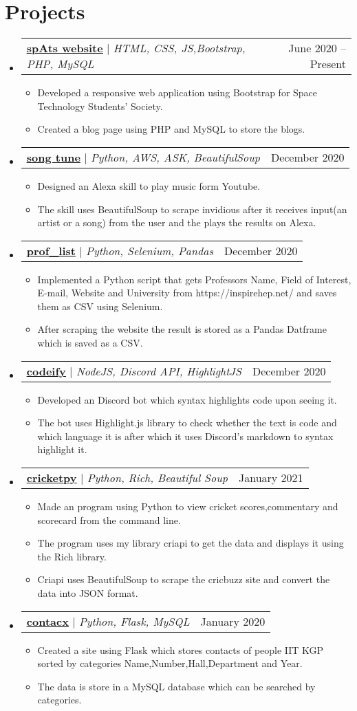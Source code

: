 \documentclass[letterpaper,11pt]{article}
\makeatletter
\newcommand{\resumeItem}[1]{
  \item\small{
    {#1 \vspace{-2pt}}
  }
}
\newcommand{\resumeProjectHeading}[2]{
    \item
    \begin{tabular*}{0.97\textwidth}{l@{\extracolsep{\fill}}r}
      \small#1 & #2 \\
    \end{tabular*}\vspace{-7pt}
}
\newcommand{\resumeSubHeadingListStart}{\begin{itemize}[leftmargin=0.15in, label={}]}
\newcommand{\resumeSubHeadingListEnd}{\end{itemize}}
\newcommand{\resumeItemListStart}{\begin{itemize}}
\newcommand{\resumeItemListEnd}{\end{itemize}\vspace{-5pt}}
\makeatother
\begin{document}
\section{Projects}
    \resumeSubHeadingListStart
      \resumeProjectHeading
          {\textbf{\href{http://spats.in/}{\underline{spAts website}}} $|$ \emph{HTML, CSS, JS,Bootstrap, PHP, MySQL}}{June 2020 -- Present}
          \resumeItemListStart
            \resumeItem{Developed a responsive web application using Bootstrap for Space Technology Students' Society.}
            \resumeItem{Created a blog page using PHP and MySQL to store the blogs.}
          \resumeItemListEnd
           \resumeProjectHeading
         {\textbf{\href{https://github.com/sAksham-Ar/song-tune}{\underline{song tune}}} $|$ \emph{Python, AWS, ASK, BeautifulSoup}}{December 2020}
          \resumeItemListStart
            \resumeItem{Designed an Alexa skill to play music form Youtube.}
            \resumeItem{The skill uses BeautifulSoup to scrape invidious after it receives input(an artist or a song) from the user and the plays the results on Alexa.}
          \resumeItemListEnd
           \resumeProjectHeading
         {\textbf{\href{https://github.com/sAksham-Ar/Prof_List}{\underline{prof\_list}}} $|$ \emph{Python, Selenium, Pandas}}{December 2020}
          \resumeItemListStart
            \resumeItem{Implemented a Python script that gets Professors Name, Field of Interest, E-mail, Website and University from https://inspirehep.net/ and saves them as CSV using Selenium. }
            \resumeItem{After scraping the website the result is stored as a Pandas Datframe which is saved as a CSV.}
          \resumeItemListEnd
           \resumeProjectHeading
         {\textbf{\href{https://github.com/sAksham-Ar/codeify}{\underline{codeify}}} $|$ \emph{NodeJS, Discord API, HighlightJS}}{December 2020}
          \resumeItemListStart
            \resumeItem{Developed an Discord bot which syntax highlights code upon seeing it.}
            \resumeItem{The bot uses Highlight.js library to check whether the text is  code and which language it is after which it uses Discord's markdown to syntax highlight it.}
          \resumeItemListEnd
 \resumeProjectHeading
         {\textbf{\href{https://github.com/sAksham-Ar/cricketpy}{\underline{cricketpy}}} $|$ \emph{Python, Rich, Beautiful Soup}}{January 2021}
          \resumeItemListStart
            \resumeItem{Made an program using Python to view cricket scores,commentary and scorecard from the command line.}
            \resumeItem{The program uses my library criapi to get the data and displays it using the Rich library.}
            \resumeItem{Criapi uses BeautifulSoup to scrape the cricbuzz site and convert the data into JSON format.}
          \resumeItemListEnd
 \resumeProjectHeading
         {\textbf{\href{https://github.com/sAksham-Ar/contacx}{\underline{contacx}}} $|$ \emph{Python, Flask, MySQL}}{January 2020}
          \resumeItemListStart
            \resumeItem{Created a site using Flask which stores contacts of people IIT KGP sorted by categories Name,Number,Hall,Department and Year. }
            \resumeItem{The data is store in a MySQL database which can be searched by categories.}
          \resumeItemListEnd
    \resumeSubHeadingListEnd
\end{document}
